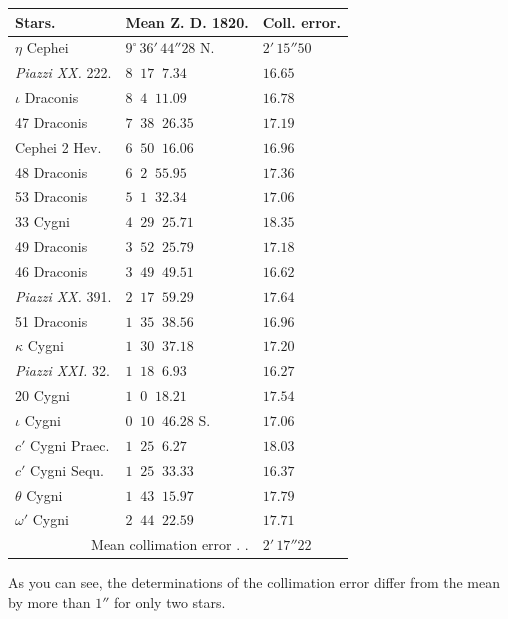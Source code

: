 \begin{center}
\begin{tabular}{l|l|l}
Stars. & Mean Z. D. 1820. & Coll. error. \\
\hline
$\eta$ Cephei & $9^\circ\,36'\,44''28$ N. & $2'\,15''50$ \\
\emph{Piazzi XX.} 222. & $8\;\;17\;\;7.34$ & $16.65$ \\
$\iota$ Draconis & $8\;\;4\;\;11.09$ & $16.78$ \\
47 Draconis & $7\;\;38\;\;26.35$ & $17.19$ \\
Cephei 2 Hev. & $6\;\;50\;\;16.06$ & $16.96$ \\
48 Draconis & $6\;\;2\;\;55.95$ & $17.36$ \\
53 Draconis & $5\;\;1\;\;32.34$ & $17.06$ \\
33 Cygni & $4\;\;29\;\;25.71$ & $18.35$ \\
49 Draconis & $3\;\;52\;\;25.79$ & $17.18$ \\
46 Draconis & $3\;\;49\;\;49.51$ & $16.62$ \\
\emph{Piazzi XX.} 391. & $2\;\;17\;\;59.29$ & $17.64$ \\
51 Draconis & $1\;\;35\;\;38.56$ & $16.96$ \\
$\kappa$ Cygni & $1\;\;30\;\;37.18$ & $17.20$ \\
\emph{Piazzi XXI.} 32. & $1\;\;18\;\;6.93$ & $16.27$ \\
20 Cygni & $1\;\;0\;\;18.21$ & $17.54$ \\
$\iota$ Cygni & $0\;\;10\;\;46.28$ S. & $17.06$ \\
$c'$ Cygni Praec. & $1\;\;25\;\;6.27$ & $18.03$ \\
$c'$ Cygni Sequ. & $1\;\;25\;\;33.33$ & $16.37$ \\
$\theta$ Cygni & $1\;\;43\;\;15.97$ & $17.79$ \\
$\omega'$ Cygni & $2\;\;44\;\;22.59$ & $17.71$ \\
\multicolumn{2}{r|}{Mean collimation error . .} & $2'\,17''22$ \\
\end{tabular}
\end{center}

As you can see, the determinations of the collimation error differ from the mean by more than $1''$ for only two stars.
